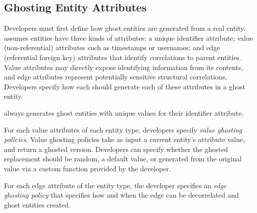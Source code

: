 \subsection{Ghosting Entity Attributes}
Developers must first define how ghost entities are generated from a real entity.
\sys assumes entities have three kinds of attributes: a unique identifier attribute; 
value (non-referential) attributes such as timestamps or usernames; and 
edge (referential foreign key) attributes that identify correlations to parent entities. 
Value attributes may directly expose identifying information from its
contents, and edge attributes represent potentially sensitive structural correlations. 
Developers specify how each \sys should generate each of these attributes in a ghost entity.

\sys always generates ghost entities with unique values for their identifier attribute.

For each value attributes of each entity type, developers specify \emph{value ghosting policies}.
Value ghosting policies take as input a current entity's attribute value, and return a ghosted
version. Developers can specify whether the ghosted replacement should be random, a default value,
or generated from the original value via a custom function provided by the developer. 

For each edge attribute of the entity type, the developer specifies an \emph{edge ghosting policy}
that specifies how and when the edge can be decorrelated and ghost entities created.


%

